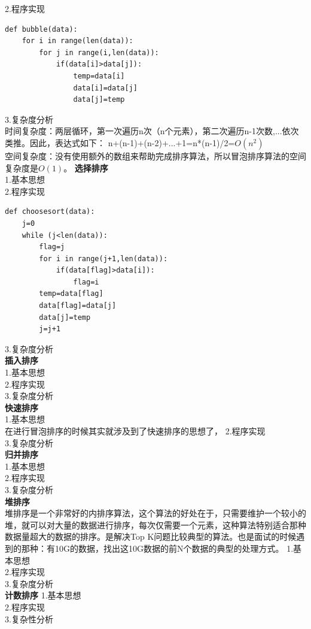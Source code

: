 \documentclass[UTF8]{ctexart}
\begin{document}
2.程序实现
\begin{lstlisting}
def bubble(data):
    for i in range(len(data)):
        for j in range(i,len(data)):
            if(data[i]>data[j]):
                temp=data[i]
                data[i]=data[j]
                data[j]=temp
\end{lstlisting}
3.复杂度分析\\
时间复杂度：两层循环，第一次遍历n次（n个元素），第二次遍历n-1次数,...依次类推。因此，表达式如下：
n+(n-1)+(n-2)+...+1=n*(n-1)/2=$O(n^2)$\\
空间复杂度：没有使用额外的数组来帮助完成排序算法，所以冒泡排序算法的空间复杂度是$O(1)$。
\textbf{选择排序}\\
1.基本思想\\
2.程序实现\\
\begin{lstlisting}
def choosesort(data):
    j=0
    while (j<len(data)):
        flag=j
        for i in range(j+1,len(data)):
            if(data[flag]>data[i]):
                flag=i
        temp=data[flag]
        data[flag]=data[j]
        data[j]=temp
        j=j+1
\end{lstlisting}
3.复杂度分析\\
\textbf{插入排序}\\
1.基本思想\\
2.程序实现\\
3.复杂度分析\\
\textbf{快速排序}\\
1.基本思想\\

在进行冒泡排序的时候其实就涉及到了快速排序的思想了，
2.程序实现\\
3.复杂度分析\\
\textbf{归并排序}\\
1.基本思想\\
2.程序实现\\
3.复杂度分析\\
\textbf{堆排序}\\
堆排序是一个非常好的内排序算法，这个算法的好处在于，只需要维护一个较小的堆，就可以对大量的数据进行排序，每次仅需要一个元素，这种算法特别适合那种数据量超大的数据的排序。是解决Top K问题比较典型的算法。也是面试的时候遇到的那种：有10G的数据，找出这10G数据的前N个数据的典型的处理方式。
1.基本思想\\
2.程序实现\\ 
3.复杂度分析\\
\textbf{计数排序}
1.基本思想\\
2.程序实现\\
3.复杂性分析\\
\end{document}
